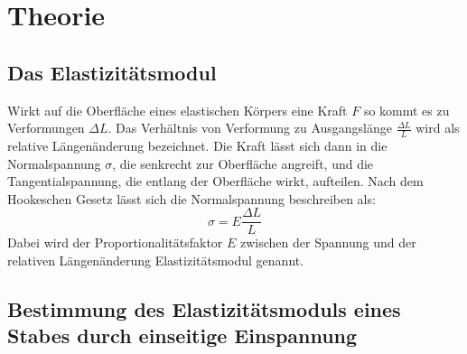 \section{Theorie}
\label{sec:Theorie}

\subsection{Das Elastizitätsmodul}

Wirkt auf die Oberfläche eines elastischen Körpers eine Kraft $F$ so kommt es zu Verformungen $\Delta L$.
Das Verhältnis von Verformung zu Ausgangslänge $\frac{\Delta L}{L}$ wird als relative Längenänderung bezeichnet.
Die Kraft lässt sich dann in die Normalspannung $\sigma$, die senkrecht zur Oberfläche angreift, und die Tangentialspannung, die entlang der Oberfläche wirkt, aufteilen.
Nach dem Hookeschen Gesetz lässt sich die Normalspannung beschreiben als:
\begin{equation}
\sigma = E \frac{\Delta L}{L} \label{eq:Hooke}
\end{equation}
Dabei wird der Proportionalitätsfaktor $E$ zwischen der Spannung und der relativen Längenänderung Elastizitätsmodul genannt.

\subsection{Bestimmung des Elastizitätsmoduls eines Stabes durch einseitige Einspannung}

